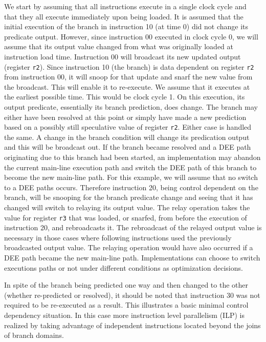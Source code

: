 \documentclass[10pt,dvips]{article}
\begin{document}
We start by assuming that all instructions execute in a single clock
cycle and that they all execute immediately upon being loaded.
It is assumed that the initial execution of the branch in
instruction 10 (at time 0) did not change its predicate output.
However, since instruction 00 executed in clock cycle 0, we will
assume that its output value changed from what was originally loaded
at instruction load time.  Instruction 00 will broadcast
its new updated output (register
{\tt r2}).
Since instruction 10 (the branch) is data dependent on
register
{\tt r2}
from instruction 00, it will snoop for that update
and snarf the new value from the broadcast.
This will enable it to re-execute.
We assume that it executes at the earliest possible time.
This would be clock cycle 1.  On this execution, its output predicate,
essentially its branch prediction, does change.  The branch may either
have been resolved at this point or simply have made a new prediction
based on a possibly still speculative value of register
{\tt r2}.
Either case is handled the same.
A change in the branch condition will change its
predication output and this will be
broadcast out.
If the branch became resolved and a DEE path originating due to this
branch had been started, an implementation may abandon the
current main-line execution path and switch the DEE path of this branch
to become the new main-line path.
For this example, we will assume that
no switch to a DEE paths occurs.  Therefore
instruction 20, being control dependent on the branch, will be snooping
for the branch predicate change and seeing that it has changed
will switch to relaying its output value.  
The relay operation
takes the value for register
{\tt r3} that was loaded, or snarfed, from before the execution
of instruction 20, and rebroadcasts it.  The rebroadcast of the relayed 
output value is necessary in those cases where following instructions
used the previously broadcasted output value.
The relaying operation would have
also occurred
if a DEE path became the new main-line path.
Implementations can choose to switch executions paths or
not under different conditions as optimization decisions.

In spite of the branch being predicted one way and then changed
to the other (whether re-predicted or resolved), it should be
noted that instruction 30 was not required to be re-executed as
a result.  This illustrates a basic minimal control dependency situation.
In this case more instruction level parallelism (ILP) is realized
by taking advantage of independent instructions located beyond the
joins of branch domains.
\end{document}
